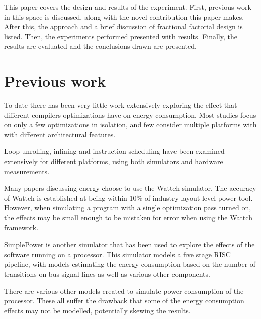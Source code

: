 \documentclass[twocolumn]{article}
\newcommand{\nsection}[1]{\section{\bfseries #1}}
\begin{document}

This paper covers the design and results of the experiment. First, previous work in this space is discussed, along with the novel contribution this paper makes. After this, the approach and a brief discussion of fractional factorial design is listed. Then, the experiments performed presented with results. Finally, the results are evaluated and the conclusions drawn are presented.

\nsection{Previous work}

To date there has been very little work extensively exploring the effect that different compilers optimizations have on energy consumption. Most studies focus on only a few optimizations in isolation, and few consider multiple platforms with with different architectural features.

Loop unrolling, inlining and instruction scheduling have been examined extensively for different platforms, using both simulators and hardware measurements\cite{EffectOfCompilerOptimizationsOnPentium4}.

Many papers discussing energy choose to use the Wattch simulator\cite{Wattch}. The accuracy of Wattch is established at being within 10\% of industry layout-level power tool. However, when simulating a program with a single optimization pass turned on, the effects may be small enough to be mistaken for error when using the Wattch framework.

SimplePower\cite{SimplePower} is another simulator that has been used to explore the effects of the software running on a processor. This simulator models a five stage RISC pipeline, with models estimating the energy consumption based on the number of transitions on bus signal lines as well as various other components.

There are various other models created to simulate power consumption of the processor\cite{Park2011,Schneider2005}. These all suffer the drawback that some of the energy consumption effects may not be modelled, potentially skewing the results.
\end{document}

